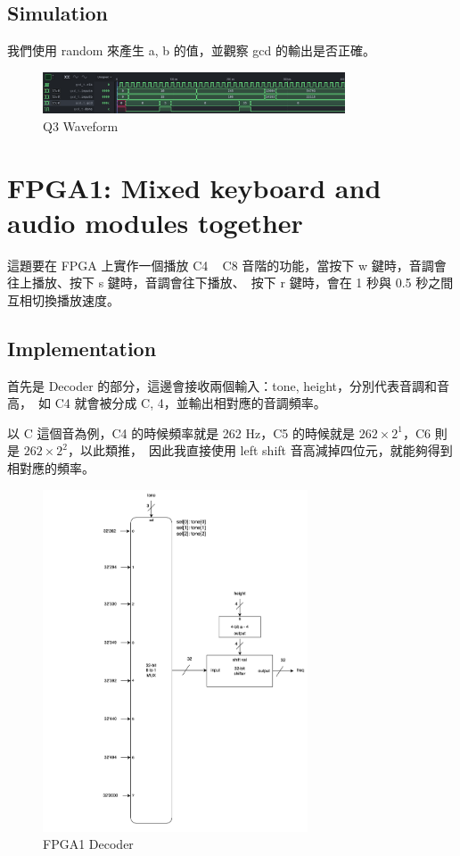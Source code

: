 \documentclass[10.5pt,compsoc,UTF8]{CjC}
\theoremstyle{mystyle}
\begin{document}
\subsection{Simulation}
我們使用 random 來產生 a, b 的值，並觀察 gcd 的輸出是否正確。

\begin{figure}[h!]
  \centering
  \includegraphics[width=0.8\textwidth]{./img/Q3-tb.png}
  \caption{Q3 Waveform}
  \label{fig:Q3-waveform}
\end{figure}

\newpage

\section{FPGA1: Mixed keyboard and audio modules together}

這題要在 FPGA 上實作一個播放 C4 ~ C8 音階的功能，當按下 w 鍵時，音調會往上播放、按下 s 鍵時，音調會往下播放、\
按下 r 鍵時，會在 1 秒與 0.5 秒之間互相切換播放速度。

\subsection{Implementation}

首先是 Decoder 的部分，這邊會接收兩個輸入：tone, height，分別代表音調和音高，\
如 C4 就會被分成 C, 4，並輸出相對應的音調頻率。
\par
以 C 這個音為例，C4 的時候頻率就是 262 Hz，C5 的時候就是 $262 \times 2^1$，C6 則是 $262 \times 2^2$，以此類推，\
因此我直接使用 left shift 音高減掉四位元，就能夠得到相對應的頻率。

\begin{figure}[h!]
  \centering
  \includegraphics[width=0.7\textwidth]{./img/FPGA1-decoder.png}
  \caption{FPGA1 Decoder}
  \label{fig:FPGA1-decoder}
\end{figure}
\newpage
\end{document}
